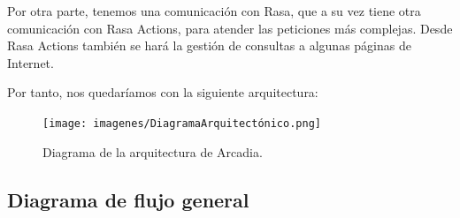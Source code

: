 Por otra parte, tenemos una comunicación con Rasa, que a su vez tiene otra comunicación con Rasa Actions, para atender las peticiones más complejas. Desde Rasa Actions también se hará la gestión de consultas a algunas páginas de Internet.

Por tanto, nos quedaríamos con la siguiente arquitectura:

\begin{figure}[H]
	\texttt{[image: imagenes/DiagramaArquitectónico.png]}
	\caption{Diagrama de la arquitectura de Arcadia.}
\end{figure}

\subsection{Diagrama de flujo general}
 
